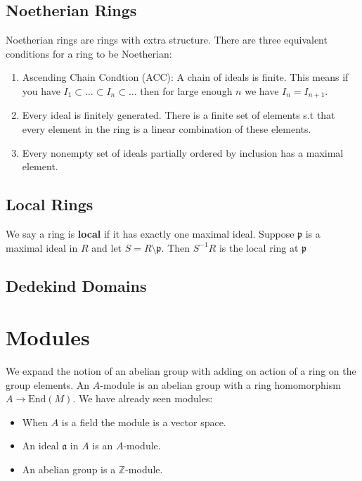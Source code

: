 \documentclass[12pt]{book}
\begin{document}
 \subsection{Noetherian Rings}
 Noetherian rings are rings with extra structure. There are three equivalent conditions for a ring to be Noetherian:
 \begin{enumerate}
 \item Ascending Chain Condtion (ACC): A chain of ideals is finite. This means if you have $I_1 \subset \ldots \subset I_n \subset \ldots$ then for large enough $n$ we have $I_{n}=I_{n+1}$.
 \item Every ideal is finitely generated. There is a finite set of elements s.t that every element in the ring is a linear combination of these elements.
 \item Every nonempty set of ideals partially ordered by inclusion has a maximal element.
 \end{enumerate}
  \subsection{Local Rings}
 We say a ring is \textbf{local} if it has exactly one maximal ideal. Suppose $\mathfrak{p}$ is a maximal ideal in $R$ and let $S=R \setminus \mathfrak{p}$. Then $S^{-1} R$ is the local ring at $\mathfrak{p}$ 
 \subsection{Dedekind Domains}
 
 \section{Modules}
 We expand the notion of an abelian group with adding on action of a ring on the group elements. An $A$-module is an abelian group with a ring homomorphism $A \rightarrow \text{End}(M)$. We have already seen modules:
 \begin{itemize}
 \item When $A$ is a field the module is a vector space.
 \item An ideal $\mathfrak{a}$ in $A$ is an $A$-module.
 \item An abelian group is a $\mathbb{Z}$-module.
 \end{itemize}
\end{document}
